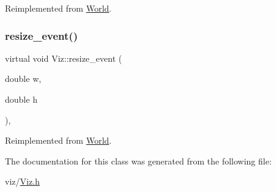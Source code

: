 Reimplemented from \mbox{\hyperlink{classWorld_ae9da24cdb1ba2803d48cf8d46c851c4b}{World}}.

\mbox{\label{classViz_a222dae75063cafe9ea0f5d50c03e3d1b}} 
\subsubsection{\texorpdfstring{resize\+\_\+event()}{resize\_event()}}
{\footnotesize\ttfamily virtual void Viz\+::resize\+\_\+event (\begin{DoxyParamCaption}\item[{double}]{w,  }\item[{double}]{h }\end{DoxyParamCaption})\hspace{0.3cm}{\ttfamily [protected]}, {\ttfamily [virtual]}}



Reimplemented from \mbox{\hyperlink{classWorld_aefc26f5ed9efe0753c3120009f608b89}{World}}.



The documentation for this class was generated from the following file\+:\begin{DoxyCompactItemize}
\item 
viz/\mbox{\hyperlink{Viz_8h}{Viz.\+h}}\end{DoxyCompactItemize}

